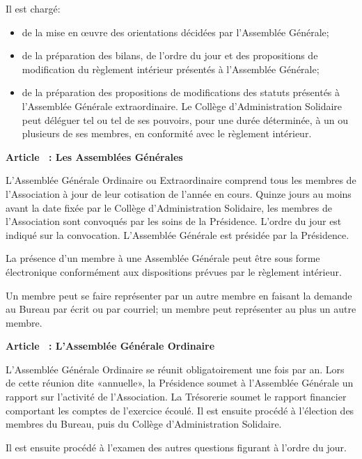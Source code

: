 \documentclass [11pt]{article}
\renewcommand {\section}[1]{\stepcounter {section}%
{\vspace {1em}\noindent\Large \bf Article \thesection\ : #1 \par}}
\begin{document}
Il est chargé:
\begin {itemize}
\item
de la mise en œuvre des orientations décidées par l'Assemblée Générale;
\item
de la préparation des bilans, de l'ordre du jour et des propositions
de modification du règlement intérieur présentés à l'Assemblée Générale;
\item
de la préparation des propositions de modifications des statuts présentés
à l'Assemblée Générale extraordinaire. Le Collège d'Administration Solidaire
peut déléguer tel ou tel de ses pouvoirs, pour une durée déterminée, à un ou
plusieurs de ses membres, en conformité avec le règlement intérieur.
\end {itemize}


\section {Les Assemblées Générales}

L'Assemblée Générale Ordinaire ou Extraordinaire comprend tous les membres
de l'Association à jour de leur cotisation de l'année en cours.
Quinze jours au moins avant la date fixée par le Collège d'Administration
Solidaire, les membres de l'Association sont convoqués par les soins de la
Présidence.
L'ordre du jour est indiqué sur la convocation.
L'Assemblée Générale est présidée par la Présidence.

La présence d'un membre à une Assemblée Générale peut être sous forme
électronique conformément aux dispositions prévues par le règlement
intérieur.

Un membre peut se faire représenter par un autre membre en faisant la
demande au Bureau par écrit ou par courriel; un membre peut représenter
au plus un autre membre.


\section {L'Assemblée Générale Ordinaire}

L'Assemblée Générale Ordinaire se réunit obligatoirement une fois par an.
Lors de cette réunion dite «annuelle», la Présidence soumet à l'Assemblée
Générale un rapport sur l'activité de l'Association. La Trésorerie soumet
le rapport financier comportant les comptes de l'exercice écoulé.
Il est ensuite procédé à l'élection des membres du Bureau, puis du
Collège d'Administration Solidaire.

Il est ensuite procédé à l'examen des autres questions figurant à l'ordre
du jour.
\end{document}
